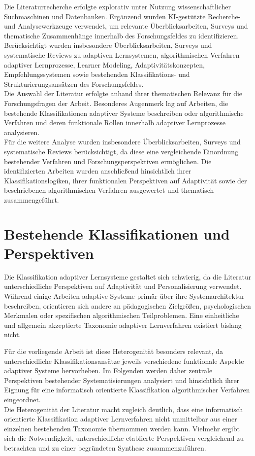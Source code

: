 Die Literaturrecherche erfolgte explorativ unter Nutzung
wissenschaftlicher Suchmaschinen und Datenbanken. Ergänzend wurden
KI-gestützte Recherche- und Analysewerkzeuge verwendet, um relevante
Überblicksarbeiten, Surveys und thematische Zusammenhänge innerhalb des
Forschungsfeldes zu identifizieren. Berücksichtigt wurden insbesondere
Überblicksarbeiten, Surveys und systematische Reviews zu adaptiven
Lernsystemen, algorithmischen Verfahren adaptiver Lernprozesse, Learner
Modeling, Adaptivitätskonzepten, Empfehlungssystemen sowie bestehenden
Klassifikations- und Strukturierungsansätzen des Forschungsfeldes.\\
Die Auswahl der Literatur erfolgte anhand ihrer thematischen Relevanz
für die Forschungsfragen der Arbeit. Besonderes Augenmerk lag auf
Arbeiten, die bestehende Klassifikationen adaptiver Systeme beschreiben
oder algorithmische Verfahren und deren funktionale Rollen innerhalb
adaptiver Lernprozesse analysieren.\\
Für die weitere Analyse wurden insbesondere Überblicksarbeiten, Surveys
und systematische Reviews berücksichtigt, da diese eine vergleichende
Einordnung bestehender Verfahren und Forschungsperspektiven ermöglichen.
Die identifizierten Arbeiten wurden anschließend hinsichtlich ihrer
Klassifikationslogiken, ihrer funktionalen Perspektiven auf Adaptivität
sowie der beschriebenen algorithmischen Verfahren ausgewertet und
thematisch zusammengeführt.

\section{Bestehende Klassifikationen und
Perspektiven}\label{bestehende-klassifikationen-und-perspektiven}

Die Klassifikation adaptiver Lernsysteme gestaltet sich schwierig, da
die Literatur unterschiedliche Perspektiven auf Adaptivität und
Personalisierung verwendet. Während einige Arbeiten adaptive Systeme
primär über ihre Systemarchitektur beschreiben, orientieren sich andere
an pädagogischen Zielgrößen, psychologischen Merkmalen oder spezifischen
algorithmischen Teilproblemen. Eine einheitliche und allgemein
akzeptierte Taxonomie adaptiver Lernverfahren existiert bislang nicht.

Für die vorliegende Arbeit ist diese Heterogenität besonders relevant,
da unterschiedliche Klassifikationsansätze jeweils verschiedene
funktionale Aspekte adaptiver Systeme hervorheben. Im Folgenden werden
daher zentrale Perspektiven bestehender Systematisierungen analysiert
und hinsichtlich ihrer Eignung für eine informatisch orientierte
Klassifikation algorithmischer Verfahren eingeordnet.\\
Die Heterogenität der Literatur macht zugleich deutlich, dass eine
informatisch orientierte Klassifikation adaptiver Lernverfahren nicht
unmittelbar aus einer einzelnen bestehenden Taxonomie übernommen werden
kann. Vielmehr ergibt sich die Notwendigkeit, unterschiedliche
etablierte Perspektiven vergleichend zu betrachten und zu einer
begründeten Synthese zusammenzuführen.


